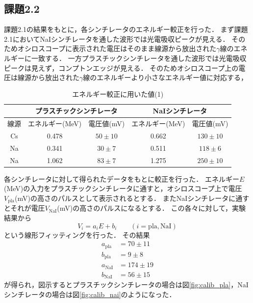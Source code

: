 \documentclass[a4paper,11pt]{jsarticle}
\begin{document}
\subsection{課題2.2}
課題2.1の結果をもとに，各シンチレータのエネルギー較正を行った．
まず課題2.1においてNaIシンチレータを通した波形では光電吸収ピークが見える．
そのためオシロスコープに表示された電圧はそのまま線源から放出された$\gamma$線のエネルギーに一致する．
一方プラスチックシンチレータを通した波形では光電吸収ピークは見えず，コンプトンエッジが見える．
そのためオシロスコープ上の電圧は線源から放出された$\gamma$線のエネルギーより小さなエネルギー値に対応する，

\begin{table}[htbp]
  \centering
  \caption{エネルギー較正に用いた値(1)}
  \label{tab:calib}  
  \begin{tabular}{c|cc|cc}
    &\multicolumn{2}{c|}{プラスチックシンチレータ}& \multicolumn{2}{c}{NaIシンチレータ}\\
    \hline
    線源 & エネルギー(MeV) & 電圧値(mV) & エネルギー(MeV) & 電圧値(mV)\\
    \hline\hline
    Cs & 0.478 & $50\pm 10$ & 0.662 & $130\pm 10$\\
    Na & 0.341 & $30\pm 7$ & 0.511 & $118\pm 6$ \\
    Na & 1.062 & $83\pm 7$ & 1.275 & $250\pm 10$ \\ 
    \hline
  \end{tabular}
\end{table}

各シンチレータに対して得られたデータをもとに較正を行った．
エネルギー$E$(MeV)の入力をプラスチックシンチレータに通すと，オシロスコープ上で電圧$V_{\mathrm{pla}}$(mV)の高さのパルスとして表示されるとする．
またNaIシンチレータに通すとそれが電圧$V_{\mathrm{NaI}}$(mV)の高さのパルスになるとする．
この各々に対して，実験結果から
\begin{equation}
  V_{i} = a_{i} E + b_{i} \qquad (i = \mathrm{pla}, \mathrm{NaI})
\end{equation}
という線形フィッティングを行った．
その結果
\begin{align}
  a_{\mathrm{pla}} &= 70 \pm 11 \\
  b_{\mathrm{pla}} &= 9 \pm 8 \\
  a_{\mathrm{NaI}} &= 174 \pm 19 \\
  b_{\mathrm{NaI}} &= 56 \pm 15
\end{align}
が得られ，図示するとプラスチックシンチレータの場合は図\ref{fig:calib_pla}，NaIシンチレータの場合は図\ref{fig:calib_nai}のようになった．
\end{document}
